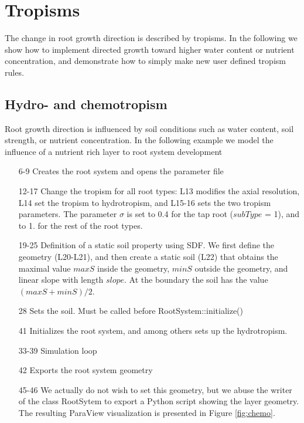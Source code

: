\newpage
\section{Tropisms} \label{sec:tropism}

The change in root growth direction is described by tropisms. In the following we show how to implement directed growth toward higher water content or nutrient concentration, and demonstrate how to simply make new user defined tropism rules. 


\subsection{Hydro- and chemotropism} \label{sec:hydro}

Root growth direction is influenced by soil conditions such as water content, soil strength, or nutrient concentration. In the following example we model the influence of a nutrient rich layer to root system development



\begin{itemize}

\item[6-9] Creates the root system and opens the parameter file

\item[12-17] Change the tropism for all root types: L13 modifies the axial resolution, L14 set the tropism to hydrotropism, and L15-16 sets the two tropism parameters. The parameter $\sigma$ is set to 0.4 for the tap root ($subType$ = 1), and to 1. for the rest of the root types.

\item[19-25] Definition of a static soil property using SDF. We first define the geometry (L20-L21), and then create a static soil (L22) that obtains the maximal value $maxS$ inside the geometry, 
$minS$ outside the geometry, and linear slope with length $slope$. At the boundary the soil has the value $(maxS+minS)/2$.

\item[28] Sets the soil. Must be called before RootSystem::initialize()

\item[41] Initializes the root system, and among others sets up the hydrotropism. 

\item[33-39] Simulation loop

\item[42] Exports the root system geometry

\item[45-46] We actually do not wish to set this geometry, but we abuse the writer of the class RootSytem to export a Python script showing the layer geometry. The resulting ParaView visualization is presented in Figure \ref{fig:chemo}.

\end{itemize}

